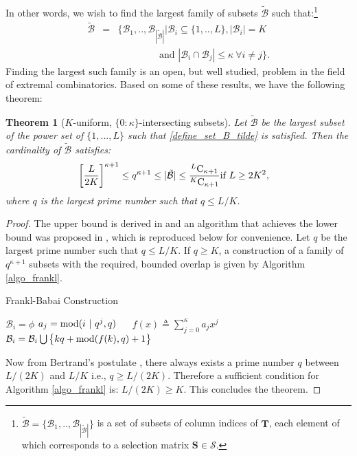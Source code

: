 \documentclass[journal,comsoc]{IEEEtran}
\newtheorem{theorem}{Theorem}[section]
\begin{document}
%
In other words, we wish to find the largest family of subsets $\mathcal{\tilde{B}}$ such that:\footnote{\label{note3} $\mathcal{\tilde{B}} = \{ \mathcal{B}_1,..,\mathcal{B}_{|\tilde{\mathcal{B}}|} \}$ is a set of subsets of column indices of $\mathbf{T}$, each element of which corresponds to a selection matrix $\mathbf{S} \in \mathcal{S}$.} 
\begin{eqnarray}
\mathcal{\tilde{B}} &=& \big\{\mathcal{B}_1,..,\mathcal{B}_{|\mathcal{\tilde{B}}|} \big| \mathcal{B}_i \subseteq \{1,..,L\}, |\mathcal{B}_i| = K \nonumber \\
&& \qquad \qquad \text{ and } |\mathcal{B}_i \cap \mathcal{B}_j| \leq \kappa \ \forall i \neq j \big\}. \label{define_set_B_tilde}
\end{eqnarray}
Finding the largest such family is an open, but well studied, problem in the field of extremal combinatorics. Based on some of these results, we have the following theorem:
\begin{theorem}[$K$-uniform, $\{0:\kappa\}$-intersecting subsets] \label{Th_Kuniform_Mintersecting_sets}
Let $\tilde{\mathcal{B}}$ be the largest subset of the power set of $\{1,...,L\}$ such that \eqref{define_set_B_tilde} is satisfied. Then the cardinality of $\tilde{\mathcal{B}}$ satisfies: 
\begin{eqnarray} \label{eqn_overlap1_th}
{\left[\frac{L}{2 K}\right]}^{\kappa+1} \leq q^{\kappa+1} \leq |\mathcal{\tilde{B}}| \leq \frac{{}^{L} {\rm C}_{\kappa+1}}{{}^{K} {\rm C}_{\kappa+1}} & \text{if $L \geq 2 K^2$},
\end{eqnarray}
where $q$ is the largest prime number such that $q \leq L/K$.
\end{theorem}
\begin{proof}
The upper bound is derived in \cite{Deza1980} and an algorithm that achieves the lower bound was proposed in \cite[Theorem 4.11]{Babai1992}, which is reproduced below for convenience. 
%
Let $q$ be the largest prime number such that $q \leq L/K$. If $q \geq K$, a construction of a family of $q^{\kappa+1}$ subsets with the required, bounded overlap is given by Algorithm \ref{algo_frankl}. 
%
\begin{algorithm}
\caption{Frankl-Babai Construction \cite{Babai1992}}\label{algo_frankl}
\begin{algorithmic}[1]
\STATE $\mathcal{B}_i = \phi$
\STATE $a_j = {\rm mod}(i \ | \ q^{j}, q)$ \ \ 
\ENDFOR
\STATE $f(x) \triangleq \sum_{j=0}^{\kappa} a_j x^j$
\STATE $\mathcal{B}_i = \mathcal{B}_i \bigcup \big\{ k q + {\rm mod}(f(k),q)+1\big\}$
\ENDFOR
\ENDFOR
\end{algorithmic}
\end{algorithm}
%
Now from Bertrand's postulate \cite{Ramanujan1919, BertrandWolfram}, there always exists a prime number $q$ between $L/(2K)$ and $L/K$ i.e., $q \geq L/(2K)$. Therefore a sufficient condition for Algorithm \ref{algo_frankl} is: $L/(2K) \geq K$. This concludes the theorem.
\end{proof}
\end{document}
